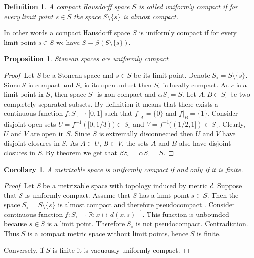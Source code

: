 \documentclass[12pt]{article}
\newtheorem{proposition}[theorem]{Proposition}
\newtheorem{corollary}[theorem]{Corollary}
\newtheorem{definition}[theorem]{Definition}
\begin{document}
\begin{definition} A compact Hausdorff space $S$ is called uniformly compact if for every limit point $s\in S$ the space $S\setminus\{s\}$ is almost compact.
\end{definition}

In other words a compact Hausdorff space $S$ is uniformly compact if for every limit point $s\in S$ we have $S=\beta(S\setminus\{s\})$.

\begin{proposition}\label{StoneSpUnifComp} Stonean spaces are uniformly compact.
\end{proposition}
\begin{proof} Let $S$ be a Stonean space and $s\in S$ be its limit point. Denote $S_\circ=S\setminus\{s\}$. Since $S$ is compact and $S_\circ$ is its open subset then $S_\circ$ is locally compact. As $s$ is a limit point in $S$, then space $S_\circ$ is non-compact and $\alpha S_\circ=S$. Let $A,B\subset S_\circ$ be two completely separated subsets. By definition it means that there exists a continuous function $f:S_\circ\to\mathbb[0,1]$ such that $f|_A=\{0\}$ and $f|_B=\{1\}$. Consider disjoint open sets $U=f^{-1}([0,1/3))\subset S_\circ$ and $V=f^{-1}((1/2,1])\subset S_\circ$. Clearly, $U$ and $V$ are open in $S$. Since $S$ is extremally disconnected then $U$ and $V$ have disjoint closures in $S$. As $A\subset U$, $B\subset V$, the sets $A$ and $B$ also have disjoint closures in $S$. By theorem \cite[theorem 3.6.2]{EngkingGenTop} we get that $\beta S_\circ=\alpha S_\circ=S$.
\end{proof}

\begin{corollary} \label{MesSpUnifCompIffFin} A metrizable space is uniformly compact if and only if it is finite.
\end{corollary}
\begin{proof} Let $S$ be a metrizable space with topology induced by metric $d$. Suppose that $S$ is uniformly compact. Assume that $S$ has a limit point $s\in S$. Then the space $S_\circ=S\setminus\{s\}$ is almost compact and therefore pseudocompact \cite[proposition 1.3.10]{HrusPsdCompTopSp}. Consider continuous function $f:S_\circ\to\mathbb{R}:x\mapsto d(x,s)^{-1}$. This function is unbounded because $s\in S$ is a limit point. Therefore $S_\circ$ is not pseudocompact. Contradiction. Thus $S$ is a compact metric space without limit points, hence $S$ is finite.

    Conversely, if $S$ is finite it is vacuously uniformly compact.
\end{proof}
\end{document}
